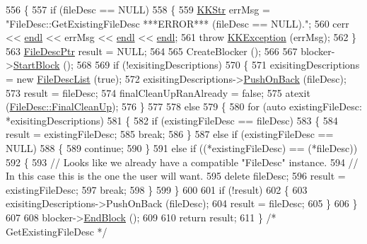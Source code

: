 \begin{DoxyCode}
556 \{
557   \textcolor{keywordflow}{if} (fileDesc == NULL)
558   \{
559     \hyperlink{class_k_k_b_1_1_k_k_str}{KKStr} errMsg = \textcolor{stringliteral}{"FileDesc::GetExistingFileDesc   ***ERROR***   (fileDesc == NULL)."};
560     cerr << \hyperlink{namespace_k_k_b_ad1f50f65af6adc8fa9e6f62d007818a8}{endl} << errMsg << \hyperlink{namespace_k_k_b_ad1f50f65af6adc8fa9e6f62d007818a8}{endl} << \hyperlink{namespace_k_k_b_ad1f50f65af6adc8fa9e6f62d007818a8}{endl};
561     \textcolor{keywordflow}{throw} \hyperlink{class_k_k_b_1_1_k_k_exception}{KKException} (errMsg);
562   \}
563   \hyperlink{class_k_k_m_l_l_1_1_file_desc}{FileDescPtr}  result = NULL;
564 
565   CreateBlocker ();
566 
567   blocker->\hyperlink{class_k_k_b_1_1_goal_keeper_a2a9565f88cee7b4339c24ed4d5155419}{StartBlock} ();
568 
569   \textcolor{keywordflow}{if}  (!exisitingDescriptions)
570   \{
571     exisitingDescriptions = \textcolor{keyword}{new} \hyperlink{class_k_k_m_l_l_1_1_file_desc_list}{FileDescList} (\textcolor{keyword}{true});
572     exisitingDescriptions->\hyperlink{class_k_k_b_1_1_k_k_queue_aa9fba4632b54268bf71ecb42dee0b575}{PushOnBack} (fileDesc);
573     result = fileDesc;
574     finalCleanUpRanAlready = \textcolor{keyword}{false};
575     atexit (\hyperlink{class_k_k_m_l_l_1_1_file_desc_a9fd3ff4c390edd86f36488c5d1f0128b}{FileDesc::FinalCleanUp});
576   \}
577 
578   \textcolor{keywordflow}{else}
579   \{
580     \textcolor{keywordflow}{for}  (\textcolor{keyword}{auto} existingFileDesc: *exisitingDescriptions)  
581     \{
582       \textcolor{keywordflow}{if}  (existingFileDesc == fileDesc)
583       \{
584         result = existingFileDesc;
585         \textcolor{keywordflow}{break};
586       \}
587       \textcolor{keywordflow}{else} \textcolor{keywordflow}{if}  (existingFileDesc == NULL)
588       \{
589         \textcolor{keywordflow}{continue};
590       \}
591       \textcolor{keywordflow}{else} \textcolor{keywordflow}{if}  ((*existingFileDesc) == (*fileDesc))
592       \{
593         \textcolor{comment}{// Looks like we already have a compatible "FileDesc" instance.}
594         \textcolor{comment}{// In this case this is the one the user will want.}
595         \textcolor{keyword}{delete}  fileDesc;
596         result = existingFileDesc;
597         \textcolor{keywordflow}{break};
598       \}
599     \}
600 
601     \textcolor{keywordflow}{if}  (!result)
602     \{
603       exisitingDescriptions->PushOnBack (fileDesc);
604       result = fileDesc;
605     \}
606   \}
607 
608   blocker->\hyperlink{class_k_k_b_1_1_goal_keeper_aee88d11d3466dd77ef3e5b18c87e27fb}{EndBlock} ();
609 
610   \textcolor{keywordflow}{return}  result;
611 \} \textcolor{comment}{/* GetExistingFileDesc */}
\end{DoxyCode}
